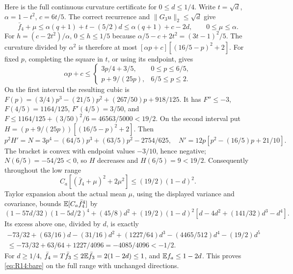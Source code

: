 Here is the full continuous curvature certificate for $0\le d\le1/4$.
Write $t=\sqrt d$, $\alpha=1-t^2$, $c=6t/5$. The correct recurrence
and $\|G_3u\|_2\le\sqrt d$ give
\[
\bar f_4+\mu\le\alpha(q+1)+t-(5/2)d
\le\alpha(q+1)+c-2d,\qquad0\le\mu\le\alpha.
\]
For $h=(c-2t^2)/\alpha$, $0\le h\le1/5$ because
$\alpha/5-c+2t^2=(3t-1)^2/5$.
The curvature divided by $\alpha^2$ is therefore at most
$[\alpha p+c][(16/5-p)^2+2]$.
For fixed $p$, completing the square in $t$, or using its endpoint,
gives
\[
\alpha p+c\le\begin{cases}3p/4+3/5,&0\le p\le6/5,\\
p+9/(25p),&6/5\le p\le2.\end{cases}
\]
On the first interval the resulting cubic is
$F(p)=(3/4)p^3-(21/5)p^2+(267/50)p+918/125$.
It has $F''\le-3$, $F(4/5)=1164/125$, $F'(4/5)=3/50$, and
$F\le1164/125+(3/50)^2/6=46563/5000<19/2$.
On the second interval put
$H=(p+9/(25p))[(16/5-p)^2+2]$. Then
\[
p^2H'=N=3p^4-(64/5)p^3+(63/5)p^2-2754/625,
\quad N'=12p[p^2-(16/5)p+21/10].
\]
The bracket is convex with endpoint values $-3/10$, hence negative;
$N(6/5)=-54/25<0$, so $H$ decreases and $H(6/5)=9<19/2$.
Consequently throughout the low range
\begin{equation}\tag{R14.3.2}\label{eq:R14:curvature}
C_a[(\bar f_4+\mu)^2+2\mu^2]\le(19/2)(1-d)^2.
\end{equation}
Taylor expansion about the actual mean $\mu$, using the displayed
variance and covariance, bounds $\mathbb E[C_a\bar f_4^4]$ by
\[
(1-57d/32)(1-5d/2)^4+(45/8)d^2
+(19/2)(1-d)^2[d-4d^2+(141/32)d^3-d^4].
\]
Its excess above one, divided by $d$, is exactly
\[
\begin{gathered}
-73/32+(63/16)d-(31/16)d^2+(1227/64)d^3
-(4465/512)d^4-(19/2)d^5\\
\le-73/32+63/64+1227/4096=-4085/4096<-1/2.
\end{gathered}
\]
For $d\ge1/4$, $\bar f_4=T\bar f_3\le2\mathbb E\bar f_3
=2(1-2d)\le1$, and $\mathbb E f_a\le1-2d$. This proves
\eqref{eq:R14:bare} on the full range with unchanged directions.

